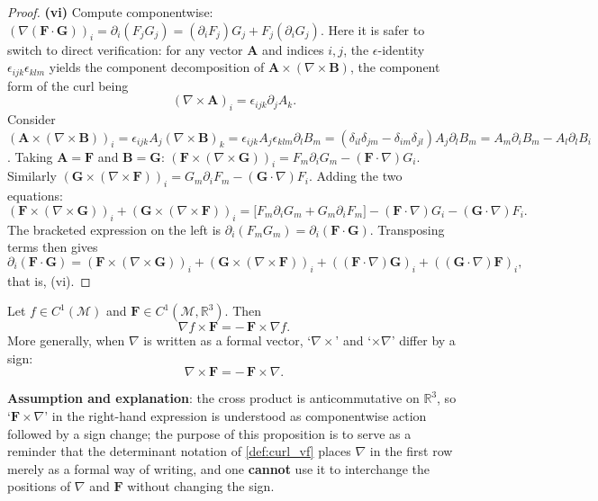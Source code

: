 \begin{proof}
\textbf{(vi)} Compute componentwise: $(\nabla(\mathbf F\cdot\mathbf G))_i = \partial_i(F_jG_j) = (\partial_iF_j)G_j + F_j(\partial_iG_j)$. Here it is safer to switch to direct verification: for any vector $\mathbf A$ and indices $i,j$, the $\epsilon$-identity $\epsilon_{ijk}\epsilon_{klm}$ yields the component decomposition of $\mathbf A\times(\nabla\times\mathbf B)$, the component form of the curl being
\[
(\nabla\times\mathbf A)_i = \epsilon_{ijk}\partial_jA_k .
\]
Consider $(\mathbf A\times(\nabla\times\mathbf B))_i = \epsilon_{ijk}A_j(\nabla\times\mathbf B)_k = \epsilon_{ijk}A_j\epsilon_{klm}\partial_lB_m = (\delta_{il}\delta_{jm}-\delta_{im}\delta_{jl})A_j\partial_lB_m = A_m\partial_iB_m - A_l\partial_lB_i$.
Taking $\mathbf A=\mathbf F$ and $\mathbf B=\mathbf G$: $(\mathbf F\times(\nabla\times\mathbf G))_i = F_m\partial_iG_m - (\mathbf F\cdot\nabla)G_i$. Similarly $(\mathbf G\times(\nabla\times\mathbf F))_i = G_m\partial_iF_m - (\mathbf G\cdot\nabla)F_i$. Adding the two equations:
\[
(\mathbf F\times(\nabla\times\mathbf G))_i + (\mathbf G\times(\nabla\times\mathbf F))_i
= \bigl[F_m\partial_iG_m + G_m\partial_iF_m\bigr] - (\mathbf F\cdot\nabla)G_i - (\mathbf G\cdot\nabla)F_i .
\]
The bracketed expression on the left is $\partial_i(F_mG_m) = \partial_i(\mathbf F\cdot\mathbf G)$. Transposing terms then gives
\[
\partial_i(\mathbf F\cdot\mathbf G) = (\mathbf F\times(\nabla\times\mathbf G))_i + (\mathbf G\times(\nabla\times\mathbf F))_i + ((\mathbf F\cdot\nabla)\mathbf G)_i + ((\mathbf G\cdot\nabla)\mathbf F)_i,
\]
that is, (vi).
\end{proof}

\begin{proposition}\label{prop:product_rules_orientation}
Let $f\in C^1(\mathcal M)$ and $\mathbf F\in C^1(\mathcal M,\mathbb R^3)$. Then
\[
\nabla f\times\mathbf F = -\,\mathbf F\times\nabla f .
\]
More generally, when $\nabla$ is written as a formal vector, `$\nabla\times$' and `$\times\nabla$' differ by a sign:
\[
\nabla\times\mathbf F = -\,\mathbf F\times\nabla .
\]

\textbf{Assumption and explanation}: the cross product is anticommutative on $\mathbb R^3$, so `$\mathbf F\times\nabla$' in the right-hand expression is understood as componentwise action followed by a sign change; the purpose of this proposition is to serve as a reminder that the determinant notation of \cref{def:curl_vf} places $\nabla$ in the first row merely as a formal way of writing, and one \textbf{cannot} use it to interchange the positions of $\nabla$ and $\mathbf F$ without changing the sign.
\end{proposition}

